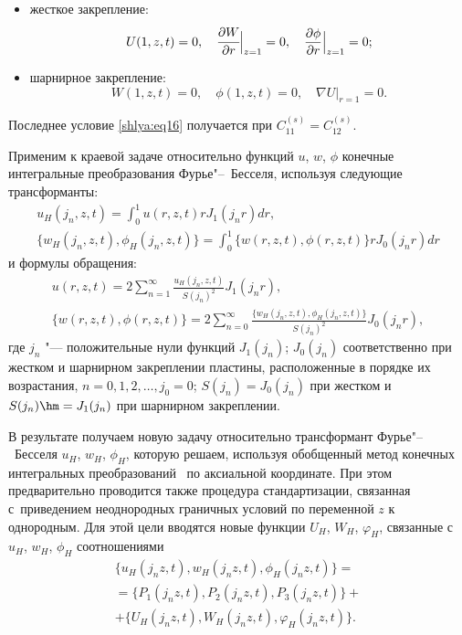 \begin{itemize}
\item жесткое закрепление: 
\begin{equation}
\label{shlya:eq15}
U(1,z,t)=0,\quad \cfrac{\partial W}{\partial r} \Big|_{z=1}=0, \quad \frac{\partial \phi }{\partial r} \Big|_{z=1} =0;
\end{equation}

\item шарнирное закрепление:
\begin{equation}
\label{shlya:eq16}
W(1,z,t)=0, \quad \phi (1,z,t)=0, \quad \nabla U \big|_{r=1} =0.
\end{equation} 
\end{itemize}

Последнее условие \eqref{shlya:eq16} получается при $C_{11}^{( s )} 
=C_{12}^{( s )} $. 

Применим к краевой задаче относительно функций $u$, $w$, $\phi $ конечные интегральные преобразования Фурье"--~Бесселя, используя следующие трансформанты: 
\begin{gather}
\label{shlya:eq17}
u_H (j_n ,z,t)=\int _0^1 u(r,z,t)rJ_1  (j_n r )dr,\\
\bigl\{ w_H (j_n ,z,t ), \phi _H (j_n ,z,t )  \bigr\}=
\int_0^1  \bigl\{ w(r,z,t),\phi (r,z,t)  \bigr\} r J_0 (j_n r )dr
\end{gather}
и формулы обращения:
\begin{gather}
\label{shlya:eq18}
u(r,z,t)=2
\sum\limits_{n=1}^\infty 
\frac{u_H (j_n,z,t )}{S (j_n )^2} J_1 (j_n r ),\\
\bigl\{ w( r,z,t), \phi (r,z,t) \bigr\}=
2\sum\limits_{n=0}^\infty 
\frac{\bigl\{ w_H (j_n ,z,t ),\phi _H (j_n ,z,t ) \bigr\}}{S(j_n )^2} J_0 (j_n r ),
\end{gather}
где $j_n$ "--- положительные нули функций $J_1 (j_n )$;
$J_0  (j_n )$ соответственно при жестком и шарнирном закреплении 
пластины, расположенные в порядке их возрастания, $n=0,1,2,\dots, j_0 =0 $; 
$S (j_n )=J_0 (j_n )$ при жестком и $S(j_n)\hm=J_1 (j_n )$  при шарнирном закреплении.


В результате получаем новую задачу относительно трансформант Фурье"--~Бесселя 
$u_H$, $w_H$, $\phi _H$, которую решаем, используя обобщенный метод конечных 
интегральных преобразований~\cite{shlya:bib24} по аксиальной координате. 
При этом  предварительно проводится также  процедура стандартизации, связанная с~приведением неоднородных граничных условий по переменной $z$ к однородным. 
Для этой цели вводятся новые функции $U_H$, $W_H$, $\varphi _H $, связанные с~$u_H$, $w_H$, $\phi _H $ соотношениями
\begin{multline}
\label{shlya:eq19}
\bigl\{ u_H (j_n z,t ), w_H (j_n z,t ), \phi _H (j_n z,t ) \bigr\}=\\
=\bigl\{ P_1 (j_n z,t ), P_2 ( j_n z,t ), P_3 (j_n z,t ) \bigr\}+\\
+\bigl\{ U_H (j_n z,t), W_H (j_n z,t ),\varphi_H (j_n z,t ) \bigr\}.
\end{multline}

